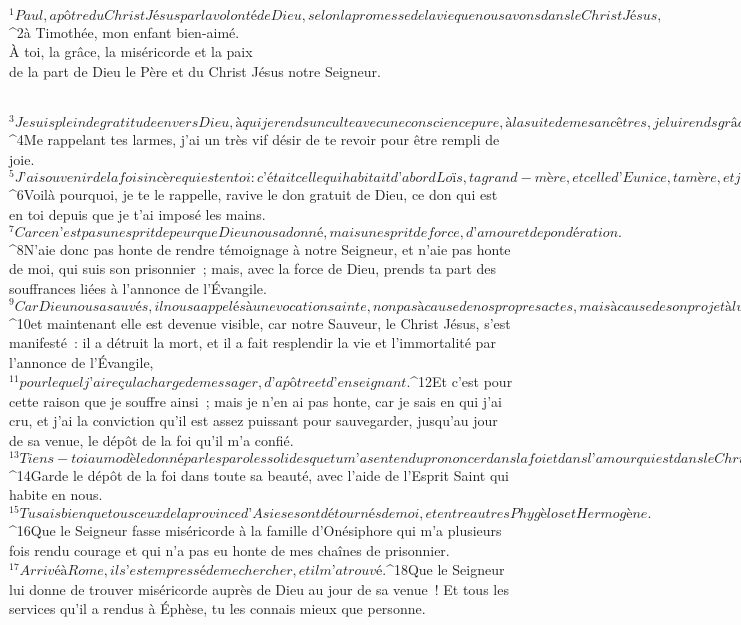   
  
    
      
         
      \bchapter{}
        ${}^{1}Paul, apôtre du Christ Jésus
        par la volonté de Dieu,
        selon la promesse de la vie
        que nous avons dans le Christ Jésus,
        ${}^{2}à Timothée,
        mon enfant bien-aimé.
        \\À toi, la grâce, la miséricorde et la paix
        \\de la part de Dieu le Père
        et du Christ Jésus notre Seigneur.
        
           
${}^{3}Je suis plein de gratitude envers Dieu, à qui je rends un culte avec une conscience pure, à la suite de mes ancêtres, je lui rends grâce en me souvenant continuellement de toi dans mes prières, nuit et jour. 
${}^{4}Me rappelant tes larmes, j’ai un très vif désir de te revoir pour être rempli de joie. 
${}^{5}J’ai souvenir de la foi sincère qui est en toi : c’était celle qui habitait d’abord Loïs, ta grand-mère, et celle d’Eunice, ta mère, et j’ai la conviction que c’est aussi la tienne.
${}^{6}Voilà pourquoi, je te le rappelle, ravive le don gratuit de Dieu, ce don qui est en toi depuis que je t’ai imposé les mains. 
${}^{7}Car ce n’est pas un esprit de peur que Dieu nous a donné, mais un esprit de force, d’amour et de pondération. 
${}^{8}N’aie donc pas honte de rendre témoignage à notre Seigneur, et n’aie pas honte de moi, qui suis son prisonnier ; mais, avec la force de Dieu, prends ta part des souffrances liées à l’annonce de l’Évangile. 
${}^{9}Car Dieu nous a sauvés, il nous a appelés à une vocation sainte, non pas à cause de nos propres actes, mais à cause de son projet à lui et de sa grâce. Cette grâce nous avait été donnée dans le Christ Jésus avant tous les siècles, 
${}^{10}et maintenant elle est devenue visible, car notre Sauveur, le Christ Jésus, s’est manifesté : il a détruit la mort, et il a fait resplendir la vie et l’immortalité par l’annonce de l’Évangile, 
${}^{11}pour lequel j’ai reçu la charge de messager, d’apôtre et d’enseignant. 
${}^{12}Et c’est pour cette raison que je souffre ainsi ; mais je n’en ai pas honte, car je sais en qui j’ai cru, et j’ai la conviction qu’il est assez puissant pour sauvegarder, jusqu’au jour de sa venue, le dépôt de la foi qu’il m’a confié. 
${}^{13}Tiens-toi au modèle donné par les paroles solides que tu m’as entendu prononcer dans la foi et dans l’amour qui est dans le Christ Jésus. 
${}^{14}Garde le dépôt de la foi dans toute sa beauté, avec l’aide de l’Esprit Saint qui habite en nous.
${}^{15}Tu sais bien que tous ceux de la province d’Asie se sont détournés de moi, et entre autres Phygèlos et Hermogène. 
${}^{16}Que le Seigneur fasse miséricorde à la famille d’Onésiphore qui m’a plusieurs fois rendu courage et qui n’a pas eu honte de mes chaînes de prisonnier. 
${}^{17}Arrivé à Rome, il s’est empressé de me chercher, et il m’a trouvé. 
${}^{18}Que le Seigneur lui donne de trouver miséricorde auprès de Dieu au jour de sa venue ! Et tous les services qu’il a rendus à Éphèse, tu les connais mieux que personne.
      
